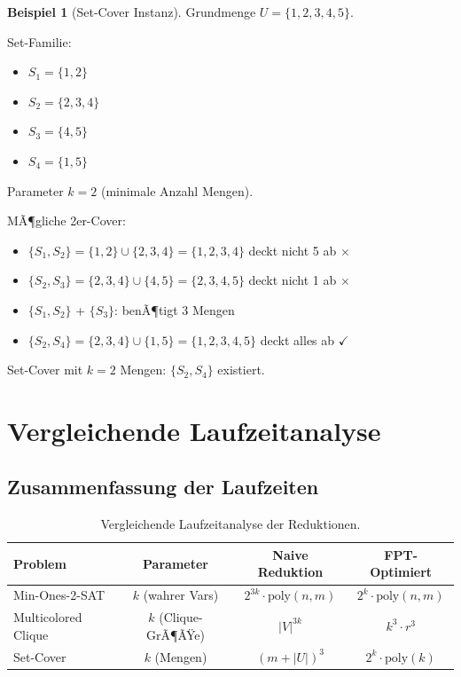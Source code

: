 ﻿\documentclass[a4paper,12pt]{article}
\theoremstyle{definition}
\newtheorem{beispiel}{Beispiel}[section]
\begin{document}
\begin{beispiel}[Set-Cover Instanz]
	Grundmenge $U = \{1, 2, 3, 4, 5\}$.
	
	Set-Familie:
	\begin{itemize}
		\item $S_1 = \{1, 2\}$
		\item $S_2 = \{2, 3, 4\}$
		\item $S_3 = \{4, 5\}$
		\item $S_4 = \{1, 5\}$
	\end{itemize}
	
	Parameter $k = 2$ (minimale Anzahl Mengen).
	
	MÃ¶gliche 2er-Cover:
	\begin{itemize}
		\item $\{S_1, S_2\} = \{1,2\} \cup \{2,3,4\} = \{1,2,3,4\}$ deckt nicht 5 ab $\times$
		\item $\{S_2, S_3\} = \{2,3,4\} \cup \{4,5\} = \{2,3,4,5\}$ deckt nicht 1 ab $\times$
		\item $\{S_1, S_2\}$ + $\{S_3\}$: benÃ¶tigt 3 Mengen
		\item $\{S_2, S_4\} = \{2,3,4\} \cup \{1,5\} = \{1,2,3,4,5\}$ deckt alles ab $\checkmark$
	\end{itemize}
	
	Set-Cover mit $k=2$ Mengen: $\{S_2, S_4\}$ existiert.
\end{beispiel}

\section{Vergleichende Laufzeitanalyse}

\subsection{Zusammenfassung der Laufzeiten}

\begin{table}[h]
	\centering
	\begin{tabular}{|l|c|c|c|}
		\hline
		\textbf{Problem} & \textbf{Parameter} & \textbf{Naive Reduktion} & \textbf{FPT-Optimiert} \\
		\hline
		Min-Ones-2-SAT & $k$ (wahrer Vars) & $2^{3k} \cdot \text{poly}(n,m)$ & $2^k \cdot \text{poly}(n,m)$ \\
		\hline
		Multicolored Clique & $k$ (Clique-GrÃ¶ÃŸe) & $|V|^{3k}$ & $k^3 \cdot r^3$ \\
		\hline
		Set-Cover & $k$ (Mengen) & $(m + |U|)^3$ & $2^k \cdot \text{poly}(k)$ \\
		\hline
	\end{tabular}
	\caption{Vergleichende Laufzeitanalyse der Reduktionen.}
\end{table}
\end{document}
